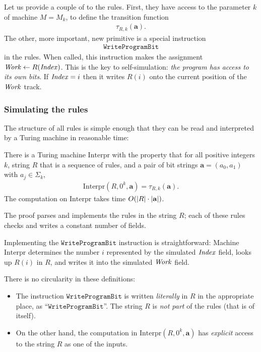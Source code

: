 \documentclass[11pt]{memoir}
\theoremstyle{definition} %
\renewcommand{\vek}[1]{\mathbf{#1}}
\newcommand{\fld}[1]{\ensuremath{\textit{#1\/}}}
\newcommand{\rul}[1]{\ensuremath{\texttt{#1}}}
\newcommand{\va}{\vek{a}} %
\newcommand{\Interpr}{\mathrm{Interpr}} %
\newcommand{\Index}{\fld{Index}}
\newcommand{\Work}{\fld{Work}} %
\newcommand{\WriteProgramBit}{\rul{WriteProgramBit}}
\begin{document}
Let us provide a couple of  to the rules.
First, they have access to the parameter \( k \) of machine \( M=M_{k} \), 
to define the transition function
 \begin{align*}
            \tau_{R,k}(\va).
 \end{align*}
The other, more important, new primitive is a special instruction
 \begin{align*}
   \WriteProgramBit
 \end{align*}
in the rules.
When called, this instruction makes the assignment \( \Work\gets R(\Index) \).
This is the key to self-simulation: \emph{the program has
access to its own bits}.
If \( \Index=i \) then it writes \( R(i) \) onto the current position of the \( \Work \) track.


\subsubsection{Simulating the rules}

The structure of all rules is simple enough that they can be read and
interpreted by a Turing machine in reasonable time:

\begin{theorem}
There is a Turing machine \( \Interpr \) with the property that for
all positive integers \( k \), string \( R \) that is a
sequence of rules, and a pair of bit strings \( \va=(a_{0},a_{1}) \) with \( a_{j}\in\Sigma_{k} \),
 \begin{align*}
  \Interpr(R,0^{k},\va)=\tau_{R,k}(\va).
 \end{align*}
The computation on \( \Interpr \) takes time \( O(\abs{R}\cdot \abs{\va}) \).
\end{theorem}

The proof parses and implements the rules in the string \( R \); each of these rules
checks and writes a constant number of fields.

Implementing the \( \WriteProgramBit \) instruction is straightforward:
Machine \( \Interpr \) determines the number \( i \)
represented by the simulated \( \Index \) field, 
looks up \( R(i) \) in \( R \), and writes it into the simulated \( \Work \) field.

There is no circularity in these definitions:
  \begin{itemize}
  \item 
The instruction \( \WriteProgramBit \) is written \emph{literally}
in \( R \) in the appropriate place, as ``\(\WriteProgramBit \)''.
The string \( R \) is \emph{not part} of the rules (that is of itself).  
  \item On the other hand, the computation in
\( \Interpr(R,0^{k},\va) \) 
has \emph{explicit} access to the string \( R \) as one of the inputs.
  \end{itemize}
\end{document}
